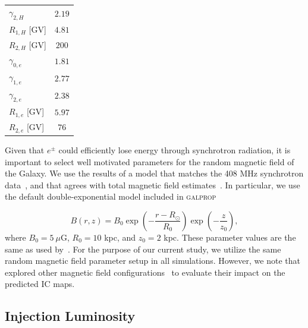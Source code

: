 \documentclass[doublespace,nopageskip]{VTthesis} %
\begin{document}
\begin{table}[htb!]
\begin{tabular}{lc}
$\gamma_{2,H}$                        & $2.19$\\
$R_{1,H}$ [GV]                        & $4.81$\\
$R_{2,H}$ [GV]                        & $200$\\
$\gamma_{0,e}$                        & $1.81$\\
$\gamma_{1,e}$                        & $2.77$\\
$\gamma_{2,e}$                        & $2.38$\\
$R_{1,e}$ [GV]                        & $5.97$\\
$R_{2,e}$ [GV]                        & $76$\\\hline\hline
\end{tabular}
\label{tab:galpropsetup}
\end{table}

Given that $e^{\pm}$ could efficiently lose energy through synchrotron radiation, it is important to select well motivated parameters for the random magnetic field of the Galaxy. We use the results of a model that matches the 408 MHz synchrotron data~\citep{Strong:1998fr}, and that agrees with total magnetic field estimates~\citep{1995ASPC...80..507H,2001SSRv...99..243B}. In particular, we use the default double-exponential model included in \textsc{galprop} 

\begin{equation}\label{eq:Bfield}
	B(r,z) = B_0 \exp{\left(-\dfrac{r-R_\odot}{R_0}\right)}\exp{\left(-\dfrac{z}{z_0}\right)},
\end{equation}
where $B_0 = 5\ \mu$G, $R_0 = 10$ kpc, and $z_0 = 2$ kpc. These parameter values are the same as used by~\citet{Johannesson:2018bit}. For the purpose of our current study, we utilize the same random magnetic field parameter setup in all simulations. However, 
we note that \cite{Song:2019nrx} explored other magnetic field configurations~\citep{Crocker:2010xc} to evaluate their impact on the predicted IC maps. 



\subsection{Injection Luminosity}
\end{document}
